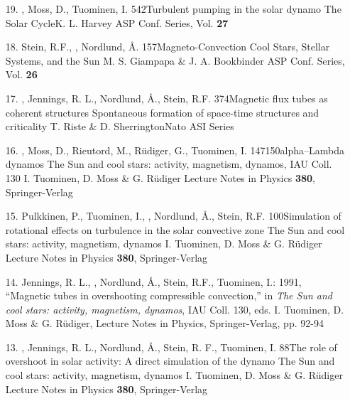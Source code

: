 \begin{itemize}
\item[19.]
\Brandenburg, Moss, D., Tuominen, I.
{542}{Turbulent pumping in the solar dynamo}
{The Solar Cycle}{K. L. Harvey}
{ASP Conf. Series, Vol. {\bf 27}}

\item[18.]
Stein, R.F., \Brandenburg, Nordlund, \AA.
{157}{Magneto-Convection}
{Cool Stars, Stellar Systems, and the Sun}
{M. S. Giampapa \& J. A. Bookbinder}
{ASP Conf. Series, Vol. {\bf 26}}

\item[17.]
\Brandenburg, Jennings, R. L., Nordlund, \AA., Stein, R.F.
{374}{Magnetic flux tubes as coherent structures}
{Spontaneous formation of space-time structures and criticality}
{T. Riste \& D. Sherrington}{Nato ASI Series}

\item[16.]
\Brandenburg, Moss, D., Rieutord, M., R\"udiger, G., Tuominen, I.
{147}{150}{alpha--Lambda dynamos}
{The Sun and cool stars: activity, magnetism, dynamos, IAU Coll. 130}
{I. Tuominen, D. Moss \& G. R\"udiger}
{Lecture Notes in Physics {\bf 380}, Springer-Verlag}

\item[15.]
Pulkkinen, P., Tuominen, I., \Brandenburg, Nordlund,
\AA., Stein, R.F.
{100}{Simulation of rotational effects on turbulence
in the solar convective zone}
{The Sun and cool stars: activity, magnetism, dynamos} 
{I. Tuominen, D. Moss \& G. R\"udiger} 
{Lecture Notes in Physics {\bf 380}, Springer-Verlag}

\item[14.]
Jennings, R. L., \Brandenburg, Nordlund, \AA., Stein, R.F., Tuominen, I.: 
1991, 
``Magnetic tubes in  overshooting compressible convection,''
in {\em The Sun and cool stars: activity, magnetism, dynamos},
IAU Coll. 130, eds. I. Tuominen, D. Moss \& G. R\"udiger,
Lecture Notes in Physics, Springer-Verlag, pp. 92-94

\item[13.]
\Brandenburg, Jennings, R. L., Nordlund, \AA., Stein, R. F.,
Tuominen, I.
{88}{The role of overshoot in solar activity: 
A direct simulation of the dynamo}
{The Sun and cool stars: activity, magnetism, dynamos} 
{I. Tuominen, D. Moss \& G. R\"udiger} 
{Lecture Notes in Physics {\bf 380}, Springer-Verlag}


\end{itemize}
